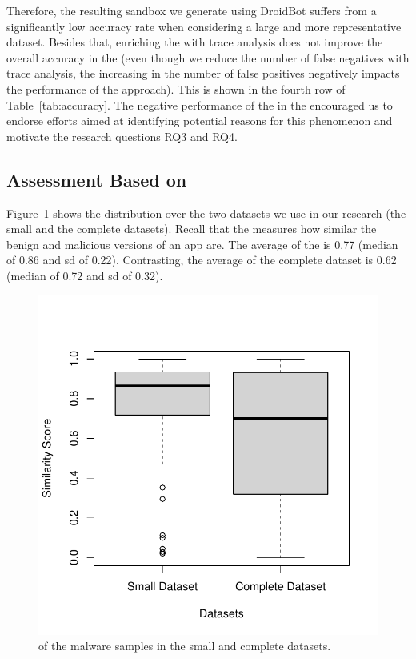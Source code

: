 Therefore, the resulting sandbox we generate using
DroidBot suffers from a significantly low accuracy rate when considering a large and more representative dataset.
Besides that, enriching the \mas with trace analysis does not 
improve the overall accuracy in the \cds (even though we reduce the
number of false negatives with trace analysis, the increasing in the
number of false positives negatively impacts the performance of the
approach). This is shown in the fourth row of Table~\ref{tab:accuracy}.
The negative performance of the \mas in the \cds encouraged us to endorse efforts aimed at identifying potential reasons for
this phenomenon and motivate the research questions RQ3 and RQ4. 



\subsection{Assessment Based on \sscore}

Figure~\ref{fig:ss} shows the \sscore distribution
over the two datasets we use in our research
(the small and the complete datasets).
Recall that the \sscore measures how similar the
benign and malicious versions of an app are.
The average \sscore of the
\sds is 0.77 (median of 0.86 and sd of 0.22). Contrasting,
the average \sscore of the complete dataset is
0.62 (median of 0.72 and sd of 0.32).

\begin{figure}
  \includegraphics[width=\columnwidth]{images/similarity-1.pdf}
  \caption{\sscore of the malware samples in the small and complete datasets.}
  \label{fig:ss}
\end{figure}

